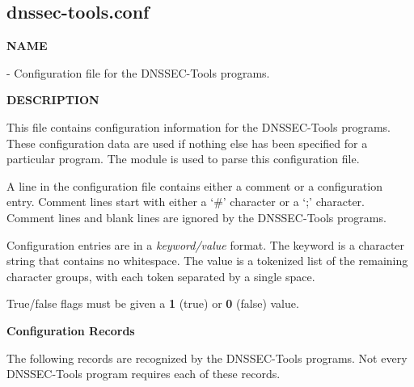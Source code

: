 \clearpage

\subsection{\bf dnssec-tools.conf}

{\bf NAME}

 - Configuration file for the DNSSEC-Tools programs.

{\bf DESCRIPTION}

This file contains configuration information for the DNSSEC-Tools programs.
These configuration data are used if nothing else has been specified for a
particular program.  The  module is used to parse this
configuration file.

A line in the configuration file contains either a comment or a configuration
entry.  Comment lines start with either a `\#' character or a `;' character.
Comment lines and blank lines are ignored by the DNSSEC-Tools programs.

Configuration entries are in a {\it keyword/value} format.  The keyword is a
character string that contains no whitespace.  The value is a tokenized list
of the remaining character groups, with each token separated by a single space.

True/false flags must be given a {\bf 1} (true) or {\bf 0} (false) value.

{\bf Configuration Records}

The following records are recognized by the DNSSEC-Tools programs.
Not every DNSSEC-Tools program requires each of these records.

